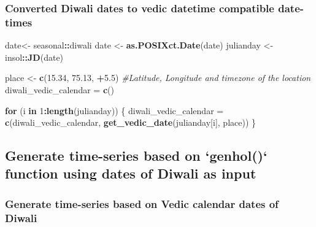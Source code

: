 \documentclass[
]{article}
\newenvironment{Shaded}{\begin{snugshade}}{\end{snugshade}}
\newcommand{\CommentTok}[1]{\textcolor[rgb]{0.56,0.35,0.01}{\textit{#1}}}
\newcommand{\ControlFlowTok}[1]{\textcolor[rgb]{0.13,0.29,0.53}{\textbf{#1}}}
\newcommand{\DecValTok}[1]{\textcolor[rgb]{0.00,0.00,0.81}{#1}}
\newcommand{\FloatTok}[1]{\textcolor[rgb]{0.00,0.00,0.81}{#1}}
\newcommand{\FunctionTok}[1]{\textcolor[rgb]{0.13,0.29,0.53}{\textbf{#1}}}
\newcommand{\NormalTok}[1]{#1}
\newcommand{\OtherTok}[1]{\textcolor[rgb]{0.56,0.35,0.01}{#1}}
\newcommand{\SpecialCharTok}[1]{\textcolor[rgb]{0.81,0.36,0.00}{\textbf{#1}}}
\begin{document}
\hypertarget{converted-diwali-dates-to-vedic-datetime-compatible-date-times}{%
\subsubsection{Converted Diwali dates to vedic datetime compatible
date-times}\label{converted-diwali-dates-to-vedic-datetime-compatible-date-times}}

\begin{Shaded}
\begin{Highlighting}[]
\NormalTok{date}\OtherTok{\textless{}{-}}\NormalTok{ seasonal}\SpecialCharTok{::}\NormalTok{diwali}
\NormalTok{date }\OtherTok{\textless{}{-}} \FunctionTok{as.POSIXct.Date}\NormalTok{(date)}
\NormalTok{julianday }\OtherTok{\textless{}{-}}\NormalTok{ insol}\SpecialCharTok{::}\FunctionTok{JD}\NormalTok{(date)}


\NormalTok{place }\OtherTok{\textless{}{-}} \FunctionTok{c}\NormalTok{(}\FloatTok{15.34}\NormalTok{, }\FloatTok{75.13}\NormalTok{, }\SpecialCharTok{+}\FloatTok{5.5}\NormalTok{) }\CommentTok{\#Latitude, Longitude and timezone of the location}
\NormalTok{diwali\_vedic\_calendar }\OtherTok{=} \FunctionTok{c}\NormalTok{()}

\ControlFlowTok{for}\NormalTok{ (i }\ControlFlowTok{in} \DecValTok{1}\SpecialCharTok{:}\FunctionTok{length}\NormalTok{(julianday)) }
\NormalTok{\{}
\NormalTok{  diwali\_vedic\_calendar }\OtherTok{=} \FunctionTok{c}\NormalTok{(diwali\_vedic\_calendar, }\FunctionTok{get\_vedic\_date}\NormalTok{(julianday[i], place))}
\NormalTok{\}}
\end{Highlighting}
\end{Shaded}

\hypertarget{generate-time-series-based-on-genhol-function-using-dates-of-diwali-as-input}{%
\subsection{Generate time-series based on `genhol()` function using
dates of Diwali as
input}\label{generate-time-series-based-on-genhol-function-using-dates-of-diwali-as-input}}

\hypertarget{generate-time-series-based-on-vedic-calendar-dates-of-diwali}{%
\subsubsection{Generate time-series based on Vedic calendar dates of
Diwali}\label{generate-time-series-based-on-vedic-calendar-dates-of-diwali}}
\end{document}
